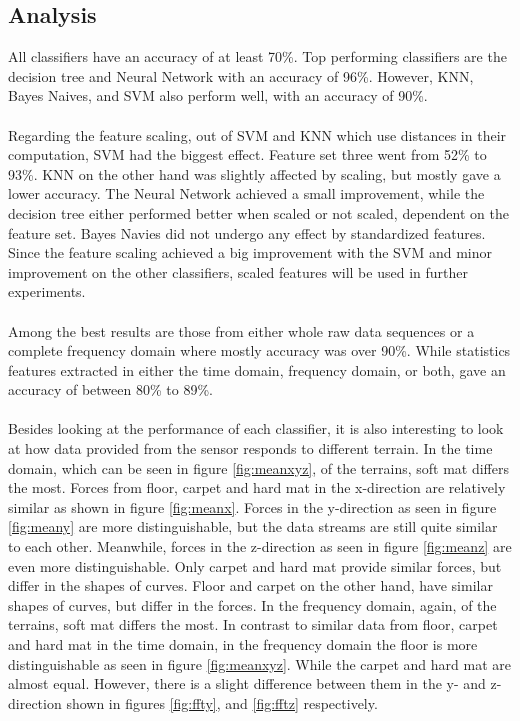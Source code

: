 \documentclass[USenglish]{ifimaster}  %
\begin{document}
\subsection{Analysis}
All classifiers have an accuracy of at least 70\%. Top performing classifiers are the decision tree and Neural Network with an accuracy of 96\%. However, KNN, Bayes Naives, and SVM also perform well, with an accuracy of 90\%. 
\\
\\
Regarding the feature scaling, out of SVM and KNN which use distances in their computation, SVM had the biggest effect. Feature set three went from 52\% to 93\%. KNN on the other hand was slightly affected by scaling, but mostly gave a lower accuracy. The Neural Network achieved a small improvement, while the decision tree either performed better when scaled or not scaled, dependent on the feature set. Bayes Navies did not undergo any effect by standardized features. Since the feature scaling achieved a big improvement with the SVM and minor improvement on the other classifiers, scaled features will be used in further experiments.
\\
\\
Among the best results are those from either whole raw data sequences or a complete frequency domain where mostly accuracy was over 90\%. While statistics features extracted in either the time domain, frequency domain, or both, gave an accuracy of between 80\% to 89\%.
\\
\\
Besides looking at the performance of each classifier, it is also interesting to look at how data provided from the sensor responds to different terrain. In the time domain, which can be seen in figure \ref{fig:meanxyz}, of the terrains, soft mat differs the most. Forces from floor, carpet and hard mat in the x-direction are relatively similar as shown in figure \ref{fig:meanx}. Forces in the y-direction as seen in figure \ref{fig:meany} are more distinguishable, but the data streams are still quite similar to each other. Meanwhile, forces in the z-direction as seen in figure \ref{fig:meanz} are even more distinguishable. Only carpet and hard mat provide similar forces, but differ in the shapes of curves. Floor and carpet on the other hand, have similar shapes of curves, but differ in the forces. In the frequency domain, again, of the terrains, soft mat differs the most. In contrast to similar data from floor, carpet and hard mat in the time domain, in the frequency domain the floor is more distinguishable as seen in figure \ref{fig:meanxyz}. While the carpet and hard mat are almost equal. However, there is a slight difference between them in the y- and z-direction shown in figures \ref{fig:ffty}, and \ref{fig:fftz} respectively.
\end{document}
